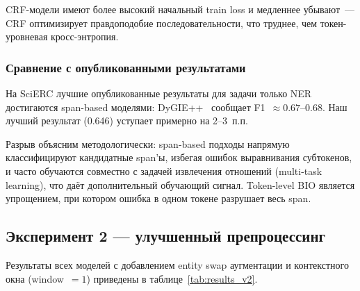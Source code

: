CRF-модели имеют более высокий начальный train loss и медленнее убывают~--- CRF оптимизирует правдоподобие последовательности, что труднее, чем токен-уровневая кросс-энтропия.

\subsubsection{Сравнение с опубликованными результатами}

На SciERC лучшие опубликованные результаты для задачи только NER достигаются span-based моделями: DyGIE++~\cite{wadden2019dygiepp} сообщает F1~$\approx 0.67$--$0.68$. Наш лучший результат (0.646) уступает примерно на 2--3~п.п.

Разрыв объясним методологически: span-based подходы напрямую классифицируют кандидатные span'ы, избегая ошибок выравнивания субтокенов, и часто обучаются совместно с задачей извлечения отношений (multi-task learning), что даёт дополнительный обучающий сигнал. Token-level BIO является упрощением, при котором ошибка в одном токене разрушает весь span.

\subsection{Эксперимент 2 --- улучшенный препроцессинг}

Результаты всех моделей с добавлением entity swap аугментации и контекстного окна (window~$= 1$) приведены в таблице~\ref{tab:results_v2}.


